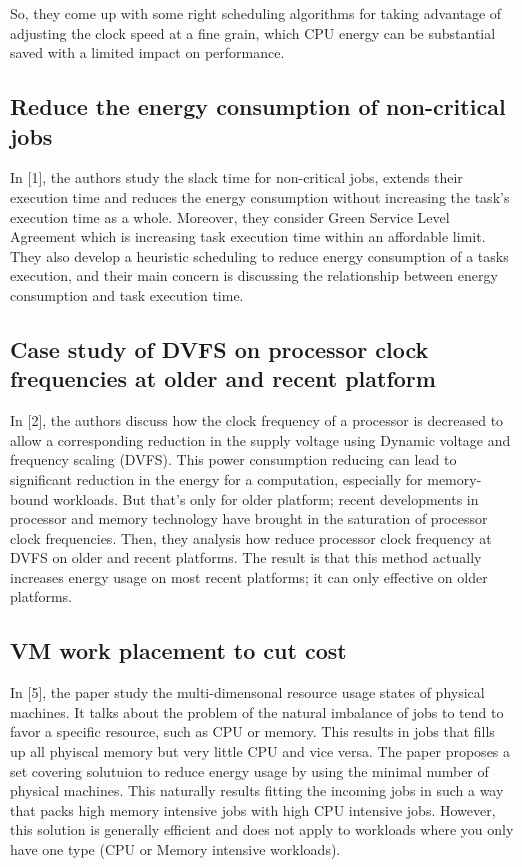 \documentclass[conference]{IEEEtran}
\begin{document}
So, they come up with some right scheduling algorithms for taking advantage of adjusting the clock speed at a fine grain, which CPU energy can be substantial saved with a limited impact on performance.

\subsection{Reduce the energy consumption of non-critical jobs}

In [1], the authors study the slack time for non-critical jobs, extends their execution time and reduces the energy consumption without increasing the task’s execution time as a whole. Moreover, they consider Green Service Level Agreement which is increasing task execution time within an affordable limit. They also develop a heuristic scheduling to reduce energy consumption of a tasks execution, and their main concern is discussing the relationship between energy consumption and task execution time.

\subsection{ Case study of DVFS on processor clock frequencies at older and recent platform}

In [2], the authors discuss how the clock frequency of a processor is decreased to allow a corresponding reduction in the supply voltage using Dynamic voltage and frequency scaling (DVFS). This power consumption reducing can lead to significant reduction in the energy for a computation, especially for memory-bound workloads. But that’s only for older platform; recent developments in processor and memory technology have brought in the saturation of processor clock frequencies. Then, they analysis how reduce processor clock frequency at DVFS on older and recent platforms. The result is that this method actually increases energy usage on most recent platforms; it can only effective on older platforms.

\subsection{ VM work placement to cut cost}
In [5], the paper study the multi-dimensonal resource usage states of physical machines. It talks about the problem of the natural imbalance of jobs to tend to favor a specific resource, such as CPU or memory. This results in jobs that fills up all phyiscal memory but very little CPU and vice versa. The paper proposes a set covering solutuion to reduce energy usage by using the minimal number of physical machines. This naturally results fitting the incoming jobs in such a way that packs high memory intensive jobs with high CPU intensive jobs. However, this solution is generally efficient and does not apply to workloads where you only have one type (CPU or Memory intensive workloads).\\
\end{document}
